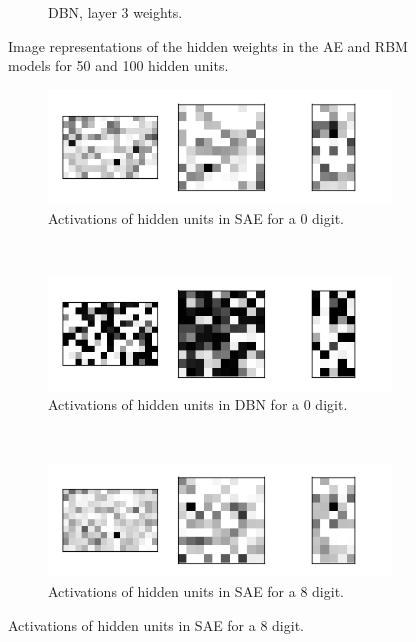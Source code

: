 \documentclass{article}
\begin{document}
\begin{figure}[!ht]
\begin{subfigure}[t]{0.47\textwidth}
    \caption{DBN, layer 3 weights.}
    \label{fig:w100rbm}
  \end{subfigure}
  \caption{
    Image representations of the hidden weights in the AE and RBM models
    for 50 and 100 hidden units.
  }
  \label{fig:hiddenweights}
\end{figure}

\begin{figure}[!ht]
  \centering
  \begin{subfigure}[t]{0.47\textwidth}
    \centering
    \includegraphics[width=\textwidth]{../plots/3_2_2/sae_d0_activations.png}
    \caption{Activations of hidden units in SAE for a 0 digit.}
  \end{subfigure}
  ~
  \begin{subfigure}[t]{0.47\textwidth}
    \centering
    \includegraphics[width=\textwidth]{../plots/3_2_2/dbn_d0_activations.png}
    \caption{Activations of hidden units in DBN for a 0 digit.}
  \end{subfigure}
  ~
  \begin{subfigure}[t]{0.47\textwidth}
    \centering
    \includegraphics[width=\textwidth]{../plots/3_2_2/sae_d8_activations.png}
    \caption{Activations of hidden units in SAE for a 8 digit.}

\end{subfigure}
\end{figure}
\end{document}
